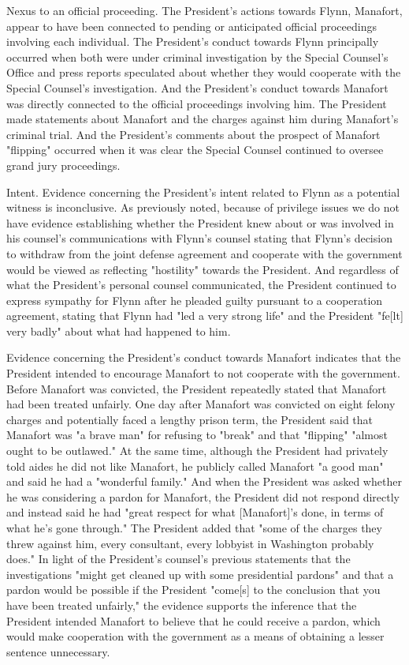 
Nexus to an official proceeding.
The President's actions towards Flynn, Manafort, appear to have been connected to pending or anticipated official proceedings involving each individual.
The President's conduct towards Flynn principally occurred when both were under criminal investigation by the Special Counsel's Office and press reports speculated about whether they would cooperate with the Special Counsel's investigation.
And the President's conduct towards Manafort was directly connected to the official proceedings involving him.
The President made statements about Manafort and the charges against him during Manafort's criminal trial.
And the President's comments about the prospect of Manafort "flipping" occurred when it was clear the Special Counsel continued to oversee grand jury proceedings.

Intent.
Evidence concerning the President's intent related to Flynn as a potential witness is inconclusive.
As previously noted, because of privilege issues we do not have evidence establishing whether the President knew about or was involved in his counsel's communications with Flynn's counsel stating that Flynn's decision to withdraw from the joint defense agreement and cooperate with the government would be viewed as reflecting "hostility" towards the President.
And regardless of what the President's personal counsel communicated, the President continued to express sympathy for Flynn after he pleaded guilty pursuant to a cooperation agreement, stating that Flynn had "led a very strong life" and the President "fe[lt] very badly" about what had happened to him.

Evidence concerning the President's conduct towards Manafort indicates that the President intended to encourage Manafort to not cooperate with the government.
Before Manafort was convicted, the President repeatedly stated that Manafort had been treated unfairly.
One day after Manafort was convicted on eight felony charges and potentially faced a lengthy prison term, the President said that Manafort was "a brave man" for refusing to "break" and that "flipping" "almost ought to be outlawed."
At the same time, although the President had privately told aides he did not like Manafort, he publicly called Manafort "a good man" and said he had a "wonderful family."
And when the President was asked whether he was considering a pardon for Manafort, the President did not respond directly and instead said he had "great respect for what [Manafort]'s done, in terms of what he's gone through."
The President added that "some of the charges they threw against him, every consultant, every lobbyist in Washington probably does."
In light of the President's counsel's previous statements that the investigations "might get cleaned up with some presidential pardons" and that a pardon would be possible if the President "come[s] to the conclusion that you have been treated unfairly," the evidence supports the inference that the President intended Manafort to believe that he could receive a pardon, which would make cooperation with the government as a means of obtaining a lesser sentence unnecessary.


